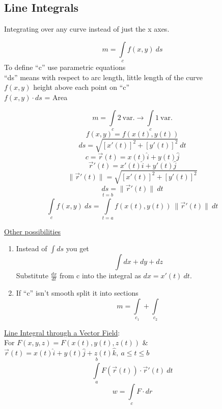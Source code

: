 \documentclass[12pt]{article}
\numberwithin{equation}{subsection}
\newcommand{\magp}[1]{\| #1 \|}
\newcommand{\indb}{\hspace{1cm}}
\begin{document}
\begin{flushleft}
\newpage
\subsection{Line Integrals}
Integrating over any curve instead of just the x axes.

\begin{equation}
m = \int \limits_c f(x,y)\ ds
\end{equation}
To define ``c'' use parametric equations\\
``ds'' means with respect to arc length, little length of the curve\\
$f(x,y)$ height above each point on ``c''\\
$f(x,y) \cdot ds $ = Area

$$
m = \int \limits_c 2\ \textrm{var.} \rightarrow \int \limits_c 1\ \textrm{var.}
$$
$$
f(x,y) = f(x(t),y(t))
$$
$$
ds = \sqrt{[x'(t)]^2 + [y'(t)]^2}\ dt
$$
$$
c = \vec{r}(t) = x(t)\hat{i} + y(t)\hat{j}
$$
$$
\vec{r}'(t) = x'(t)\hat{i} + y'(t)\hat{j}
$$
$$
\magp{\vec{r}'(t)} = \sqrt{[x'(t)]^2 + [y'(t)]^2}
$$
\begin{equation}
ds = \magp{\vec{r}'(t)}\ dt
\end{equation}
\begin{equation}
\int \limits_c f(x,y)\ ds = \int \limits_{t=a}^{t=b} f(x(t),y(t)) \ \magp{\vec{r}'(t)}\ dt
\end{equation}

\underline{Other possibilities}
\begin{enumerate} 
\item Instead of $\int ds$ you get \begin{equation}
\int dx + dy + dz
\end{equation}
Substitute $\frac{dx}{dt}$ from c into the integral as $dx = x'(t)\ dt $.
\item If ``c'' isn't smooth split it into sections \begin{equation}
m = \int \limits_{c_1} + \int \limits_{c_2}
\end{equation}
\end{enumerate}

\underline{Line Integral through a Vector Field}:\\
\indb For $F(x,y,z) = F(x(t),y(t),z(t))$ \& $\vec{r}(t) = x(t)\hat{i} + y(t)\hat{j} + z(t)\hat{k}, \ a\leq t \leq b $
\begin{equation}
\int \limits_a^b F(\vec{r}(t)) \cdot \vec{r}'(t)\ dt
\end{equation}
\begin{equation}
w = \int \limits_c F \cdot dr
\end{equation}


\end{flushleft}
\end{document}
